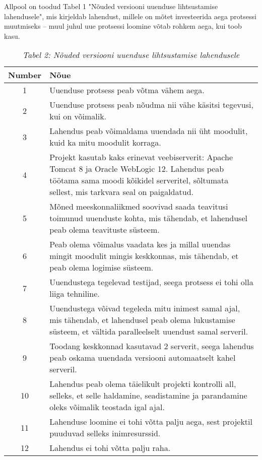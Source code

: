 \documentclass[12pt]{report}
\begin{document}
  Allpool on toodud Tabel 1 "Nõuded versiooni uuenduse lihtsustamise lahendusele", mis kirjeldab lahendust, millele on mõtet investeerida aega protsessi muutmiseks \--- muul juhul uue protsessi loomine võtab rohkem aega, kui toob kasu.
  
  \begin{table}
  \begin{tabular}{|c|p{11cm}|}
    \hline
    \textbf{Number} & \textbf{Nõue}\\
    \hline
    1 & Uuenduse protsess peab võtma vähem aega.\\
    \hline
    2 & Uuenduse protsess peab nõudma nii vähe käsitsi tegevusi, kui on võimalik.\\
    \hline
    3 & Lahendus peab võimaldama uuendada nii üht moodulit, kuid ka mitu moodulit korraga.\\
    \hline
    4 & Projekt kasutab kaks erinevat veebiserverit: Apache Tomcat 8 ja Oracle WebLogic 12. Lahendus peab töötama sama moodi kõikidel serveritel, sõltumata sellest, mis tarkvara seal on paigaldatud.\\
    \hline
    5 & Mõned meeskonnaliikmed soovivad saada teavitusi toimunud uuenduste kohta, mis tähendab, et lahendusel peab olema teavituste süsteem.\\
    \hline
    6 & Peab olema võimalus vaadata kes ja millal uuendas mingit moodulit mingis keskkonnas, mis tähendab, et peab olema logimise süsteem.\\
    \hline
    7 & Uuendustega tegelevad testijad, seega protsess ei tohi olla liiga tehniline.\\
    \hline
    8 & Uuendustega võivad tegeleda mitu inimest samal ajal, mis tähendab, et lahendusel peab olema lukustamise süsteem, et vältida paralleelselt uuendust samal serveril.\\
    \hline
    9 & Toodang keskkonnad kasutavad 2 serverit, seega lahendus peab oskama uuendada versiooni automaatselt kahel serveril.\\
    \hline
    10 & Lahendus peab olema täielikult projekti kontrolli all, selleks, et selle haldamine, seadistamine ja parandamine oleks võimalik teostada igal ajal.\\
    \hline
    11 & Lahenduse loomine ei tohi võtta palju aega, sest projektil puuduvad selleks inimresurssid.\\
    \hline
    12 & Lahendus ei tohi võtta palju raha.\\
    \hline
  \end{tabular}
  \caption*{\textit{Tabel 2: Nõuded versiooni uuenduse lihtsustamise lahendusele}}
  \end{table}
  
\end{document}

